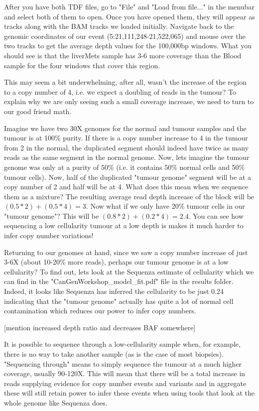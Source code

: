 After you have both TDF files, go to "File" and "Load from file..." in the menubar and select both of them to open. Once you have opened them, they will appear as tracks along with the BAM tracks we loaded initially. Navigate back to the genomic coordinates of our event (5:21,111,248-21,522,065) and mouse over the two tracks to get the average depth values for the 100,000bp windows. What you should see is that the liverMets sample has 3-6 more coverage than the Blood sample for the four windows that cover this region.

This may seem a bit underwhelming, after all, wasn't the increase of the region to a copy number of 4, i.e. we expect a doubling of reads in the tumour? To explain why we are only seeing such a small coverage increase, we need to turn to our good friend math.

Imagine we have two 30X genomes for the normal and tumour samples and the tumour is at 100\% purity. If there is a copy number increase to 4 in the tumour from 2 in the normal, the duplicated segment should indeed have twice as many reads as the same segment in the normal genome. Now, lets imagine the tumour genome was only at a purity of 50\% (i.e. it contains 50\% normal cells and 50\% tumour cells). Now, half of the duplicated "tumour genome" segment will be at a copy number of 2 and half will be at 4. What does this mean when we sequence them as a mixture? The resulting average read depth increase of the block will be $(0.5*2)+(0.5*4) = 3$. Now what if we only have 20\% tumour cells in our "tumour genome"? This will be $(0.8*2)+(0.2*4) = 2.4$. You can see how sequencing a low cellularity tumour at a low depth is makes it much harder to infer copy number variations!

Returning to our genomes at hand, since we saw a copy number increase of just 3-6X (about 10-20\% more reads), perhaps our tumour genome is at a low cellularity? To find out, lets look at the Sequenza estimate of cellularity which we can find in the "CanGenWorkshop_model_fit.pdf" file in the results folder. Indeed, it looks like Sequenza has inferred the cellularity to be just 0.24 indicating that the "tumour genome" actually has quite a lot of normal cell contamination which reduces our power to infer copy numbers.

[mention increased depth ratio and decreases BAF somewhere]

\begin{note}
It is possible to sequence through a low-cellularity sample when, for example, there is no way to take another sample (as is the case of most biopsies). "Sequencing through" means to simply sequence the tumour at a much higher coverage, usually 90-120X. This will mean that there will be a total increase in reads supplying evidence for copy number events and variants and in aggregate these will still retain power to infer these events when using tools that look at the whole genome like Sequenza does.
\end{note}

